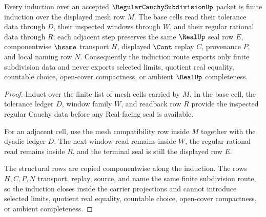 \begin{theorem}
\label{thm:regular-cauchy-subdivision-regular-window-induction}
Every induction over an accepted $\RegularCauchySubdivisionUp$ packet is finite induction over the displayed mesh row $M$. The base cells read their tolerance data through $D$, their inspected windows through $W$, and their regular rational data through $R$; each adjacent step preserves the same $\RealUp$ seal row $E$, componentwise $\hsame$ transport $H$, displayed $\Cont$ replay $C$, provenance $P$, and local naming row $N$. Consequently the induction route exports only finite subdivision data and never exports selected limits, quotient real equality, countable choice, open-cover compactness, or ambient $\RealUp$ completeness.
\end{theorem}
\begin{proof}
Induct over the finite list of mesh cells carried by $M$. In the base cell, the tolerance ledger $D$, window family $W$, and readback row $R$ provide the inspected regular Cauchy data before any Real-facing seal is available.

For an adjacent cell, use the mesh compatibility row inside $M$ together with the dyadic ledger $D$. The next window read remains inside $W$, the regular rational read remains inside $R$, and the terminal seal is still the displayed row $E$.

The structural rows are copied componentwise along the induction. The rows $H,C,P,N$ transport, replay, source, and name the same finite subdivision route, so the induction closes inside the carrier projections and cannot introduce selected limits, quotient real equality, countable choice, open-cover compactness, or ambient completeness.
\end{proof}


\begin{closurestatus}{\RegularCauchySubdivisionUp}
  \theoryclosure{\seedClosure}
  \formalstatus{\unformalizedV}
\end{closurestatus}
